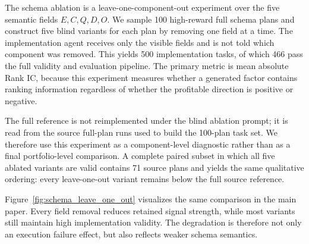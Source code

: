 The schema ablation is a leave-one-component-out experiment over the five semantic fields \(E, C, Q, D, O\). We sample 100 high-reward full schema plans and construct five blind variants for each plan by removing one field at a time. The implementation agent receives only the visible fields and is not told which component was removed. This yields 500 implementation tasks, of which 466 pass the full validity and evaluation pipeline. The primary metric is mean absolute Rank IC, because this experiment measures whether a generated factor contains ranking information regardless of whether the profitable direction is positive or negative.

\begin{table}[t]
\centering
\caption{Detailed schema-grammar leave-one-out results. Full is the source full-plan reference used to construct the ablation tasks.}
\label{tab:appendix_schema_ablation_design}
\setlength\tabcolsep{3pt}
\small
{}
\end{table}

The full reference is not reimplemented under the blind ablation prompt; it is read from the source full-plan runs used to build the 100-plan task set. We therefore use this experiment as a component-level diagnostic rather than as a final portfolio-level comparison. A complete paired subset in which all five ablated variants are valid contains 71 source plans and yields the same qualitative ordering: every leave-one-out variant remains below the full source reference.

Figure~\ref{fig:schema_leave_one_out} visualizes the same comparison in the main paper. Every field removal reduces retained signal strength, while most variants still maintain high implementation validity. The degradation is therefore not only an execution failure effect, but also reflects weaker schema semantics.


